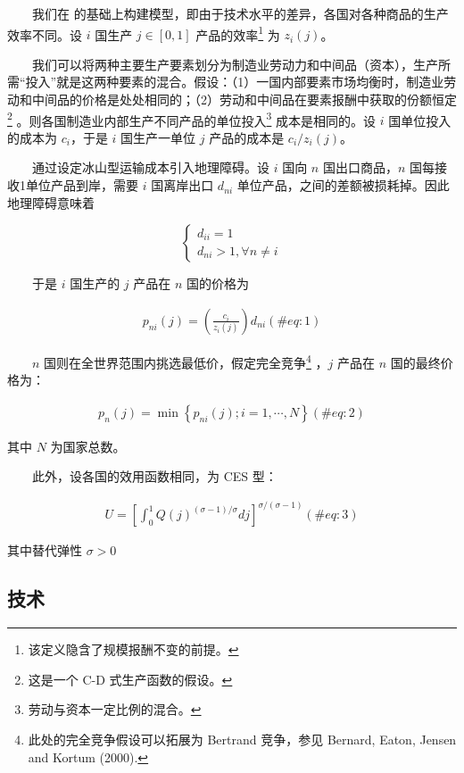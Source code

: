 \documentclass[]{tufte-handout}
\begin{document}
　　我们在 \citet{DFS1977}
的基础上构建模型，即由于技术水平的差异，各国对各种商品的生产效率不同。设
\(i\) 国生产 \(j\in[0,1]\) 产品的效率\footnote{该定义隐含了规模报酬不变的前提。}
为 \(z_i(j)\)。

　　我们可以将两种主要生产要素划分为制造业劳动力和中间品（资本），生产所需``投入''就是这两种要素的混合。假设：（1）一国内部要素市场均衡时，制造业劳动和中间品的价格是处处相同的；（2）劳动和中间品在要素报酬中获取的份额恒定\footnote{这是一个
  C-D 式生产函数的假设。}
。则各国制造业内部生产不同产品的单位投入\footnote{劳动与资本一定比例的混合。}
成本是相同的。设 \(i\) 国单位投入的成本为 \(c_i\)，于是 \(i\)
国生产一单位 \(j\) 产品的成本是 \({c_i}/{z_i(j)}\)。

　　通过设定冰山型运输成本引入地理障碍。设 \(i\) 国向 \(n\)
国出口商品，\(n\) 国每接收1单位产品到岸，需要 \(i\) 国离岸出口
\(d_{ni}\) 单位产品，之间的差额被损耗掉。因此地理障碍意味着

\[
\left\{\begin{array}{c}{d_{i i}=1} \\ {d_{n i}>1, \forall n \neq i}\end{array}\right.
\]

　　于是 \(i\) 国生产的 \(j\) 产品在 \(n\) 国的价格为

\begin{align}
p_{ni}(j)=(\frac {c_i}{z_i(j)})d_{ni} (\#eq:1)
\end{align}

　　\(n\) 国则在全世界范围内挑选最低价，假定完全竞争\footnote{此处的完全竞争假设可以拓展为
  Bertrand 竞争，参见 Bernard, Eaton, Jensen and Kortum (2000).} ，\(j\)
产品在 \(n\) 国的最终价格为：

\begin{align}
p_{n}(j)=\min \left\{p_{n i}(j) ; i=1, \cdots, N\right\}  (\#eq:2)
\end{align}

其中 \(N\) 为国家总数。

　　此外，设各国的效用函数相同，为 CES 型：

\begin{align}
U=\left[\int_{0}^{1} Q(j)^{(\sigma-1) / \sigma} d j\right]^{\sigma /(\sigma-1)} (\#eq:3)
\end{align}

其中替代弹性 \(\sigma>0\)

\hypertarget{ux6280ux672f}{%
\subsection{技术}\label{ux6280ux672f}}
\end{document}

